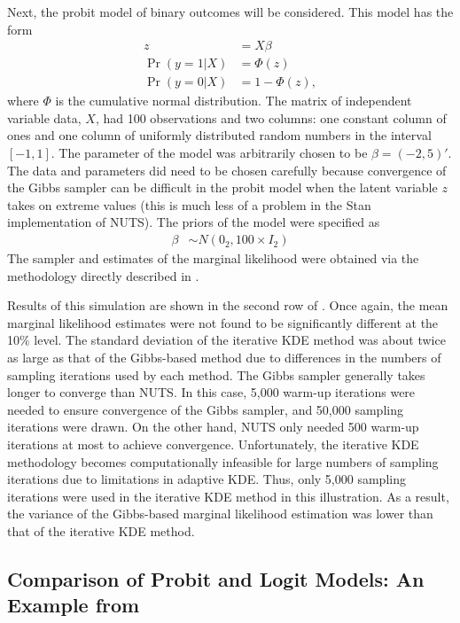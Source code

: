 \documentclass[twocolumn]{article}
\begin{document}
Next, the probit model of binary outcomes will be considered. This model has the form
\begin{subequations}
\begin{align}
	z &= X\beta \\
	\Pr(y=1|X) &= \Phi(z) \\
	\Pr(y=0|X) &= 1 - \Phi(z),
\end{align}
\end{subequations}
where $\Phi$ is the cumulative normal distribution. The matrix of independent variable data, $X$, had 100 observations and two columns: one constant column of ones and one column of uniformly distributed random numbers in the interval $[-1, 1]$. The parameter of the model was arbitrarily chosen to be $\beta = (-2, 5)'$. The data and parameters did need to be chosen carefully because convergence of the Gibbs sampler can be difficult in the probit model when the latent variable $z$ takes on extreme values (this is much less of a problem in the Stan implementation of NUTS). The priors of the model were specified as
\begin{align}
	\beta &\sim N(0_2, 100 \times I_2)
\end{align}
The sampler and estimates of the marginal likelihood were obtained via the methodology directly described in \cite{Chib}.

Results of this simulation are shown in the second row of . Once again, the mean marginal likelihood estimates were not found to be significantly different at the 10\% level. The standard deviation of the iterative KDE method was about twice as large as that of the Gibbs-based method due to differences in the numbers of sampling iterations used by each method. The Gibbs sampler generally takes longer to converge than NUTS. In this case, 5,000 warm-up iterations were needed to ensure convergence of the Gibbs sampler, and 50,000 sampling iterations were drawn. On the other hand, NUTS only needed 500 warm-up iterations at most to achieve convergence. Unfortunately, the iterative KDE methodology becomes computationally infeasible for large numbers of sampling iterations due to limitations in adaptive KDE. Thus, only 5,000 sampling iterations were used in the iterative KDE method in this illustration. As a result, the variance of the Gibbs-based marginal likelihood estimation was lower than that of the iterative KDE method.

\subsection{Comparison of Probit and Logit Models: An Example from \cite{Chib}}
\end{document}
